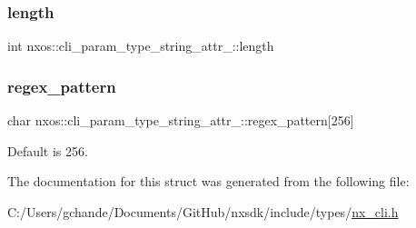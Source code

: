 \subsubsection{\texorpdfstring{length}{length}}
{\footnotesize\ttfamily int nxos\+::cli\+\_\+param\+\_\+type\+\_\+string\+\_\+attr\+\_\+\+::length}

\mbox{\label{structnxos_1_1cli__param__type__string__attr___a2a547a1318e243011f100535aebf0a49}} 
\subsubsection{\texorpdfstring{regex\+\_\+pattern}{regex\_pattern}}
{\footnotesize\ttfamily char nxos\+::cli\+\_\+param\+\_\+type\+\_\+string\+\_\+attr\+\_\+\+::regex\+\_\+pattern\mbox{[}256\mbox{]}}



Default is 256. 



The documentation for this struct was generated from the following file\+:\begin{DoxyCompactItemize}
\item 
C\+:/\+Users/gchande/\+Documents/\+Git\+Hub/nxsdk/include/types/\mbox{\hyperlink{types_2nx__cli_8h}{nx\+\_\+cli.\+h}}\end{DoxyCompactItemize}
